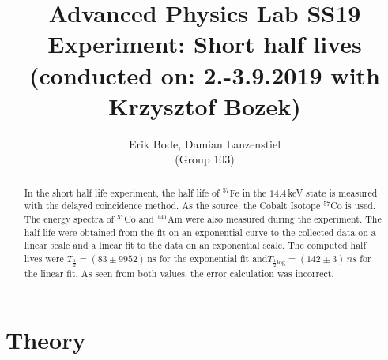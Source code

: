 \documentclass[30pt,a4paper]{article}
\title{
	\large Advanced Physics Lab	SS19 \\[4mm]
	\textbf{\LARGE Experiment: Short half lives
	} \\[4mm]
	(conducted on: 2.-3.9.2019 with Krzysztof Bozek) \\}
\author{Erik Bode, Damian Lanzenstiel \\ (Group 103)}
\begin{document}
	
	\begin{titlepage}
	\maketitle
	\vspace{2cm}
	\begin{abstract}
	In the short half life experiment, the half life of $^{57}$Fe in the $14.4$\,keV state is measured with the delayed coincidence method. As the source, the Cobalt Isotope $^{57}$Co is used. The energy spectra of $^{57}$Co and ${^141}$Am were also measured during the experiment. The half life were obtained from the fit on an exponential curve to the collected data on a linear scale and a linear fit to the data on an exponential scale. The computed half lives were $T_\frac{1}{2}=(83\pm9952)$\,ns for the exponential fit and$T_{\frac{1}{2} \textrm{log}} = (142\pm 3)\,ns$ for the linear fit. As seen from both values, the error calculation was incorrect.
	\end{abstract}
	\end{titlepage}
	\newpage
	
	\tableofcontents
	\newpage
	
	\section{Theory}
\end{document}
